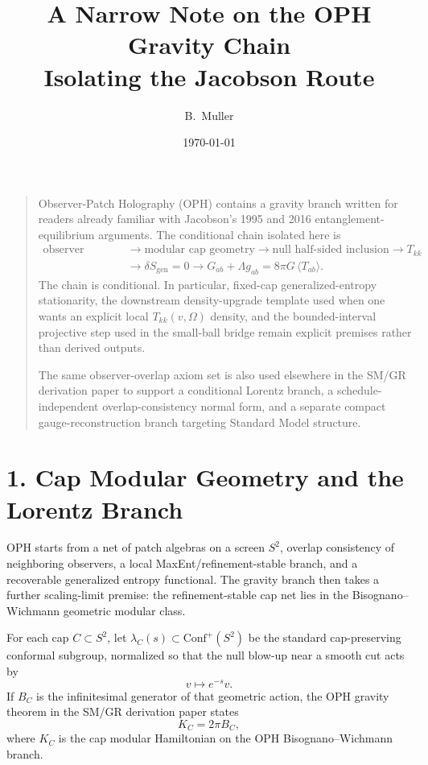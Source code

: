 \documentclass[10pt]{article}
\title{A Narrow Note on the OPH Gravity Chain\\[0.3em]\large Isolating the Jacobson Route}
\author{B.\ Muller}
\date{\today}
\newcommand{\Conf}{\mathrm{Conf}}
\begin{document}
\maketitle

\begin{quote}\small
Observer-Patch Holography (OPH) contains a gravity branch written for readers already familiar with Jacobson's 1995 and 2016 entanglement-equilibrium arguments. The conditional chain isolated here is
\[
\begin{aligned}
\text{observer overlap}
&\to \text{modular cap geometry}
\to \text{null half-sided inclusion}
\to T_{kk} \\
&\to \delta S_{\mathrm{gen}}=0
\to G_{ab}+\Lambda g_{ab}=8\pi G\,\langle T_{ab}\rangle.
\end{aligned}
\]
The chain is conditional. In particular, fixed-cap generalized-entropy stationarity, the downstream density-upgrade template used when one wants an explicit local \(T_{kk}(v,\Omega)\) density, and the bounded-interval projective step used in the small-ball bridge remain explicit premises rather than derived outputs.

The same observer-overlap axiom set is also used elsewhere in the SM/GR derivation paper to support a conditional Lorentz branch, a schedule-independent overlap-consistency normal form, and a separate compact gauge-reconstruction branch targeting Standard Model structure.
\end{quote}

\section*{1. Cap Modular Geometry and the Lorentz Branch}

OPH starts from a net of patch algebras on a screen \(S^2\), overlap consistency of neighboring observers, a local MaxEnt/refinement-stable branch, and a recoverable generalized entropy functional. The gravity branch then takes a further scaling-limit premise: the refinement-stable cap net lies in the Bisognano--Wichmann geometric modular class.

For each cap \(C \subset S^2\), let \(\lambda_C(s) \subset \Conf^+(S^2)\) be the standard cap-preserving conformal subgroup, normalized so that the null blow-up near a smooth cut acts by
\[
v \mapsto e^{-s} v.
\]
If \(B_C\) is the infinitesimal generator of that geometric action, the OPH gravity theorem in the SM/GR derivation paper states
\[
K_C = 2\pi B_C,
\]
where \(K_C\) is the cap modular Hamiltonian on the OPH Bisognano--Wichmann branch.
\end{document}
